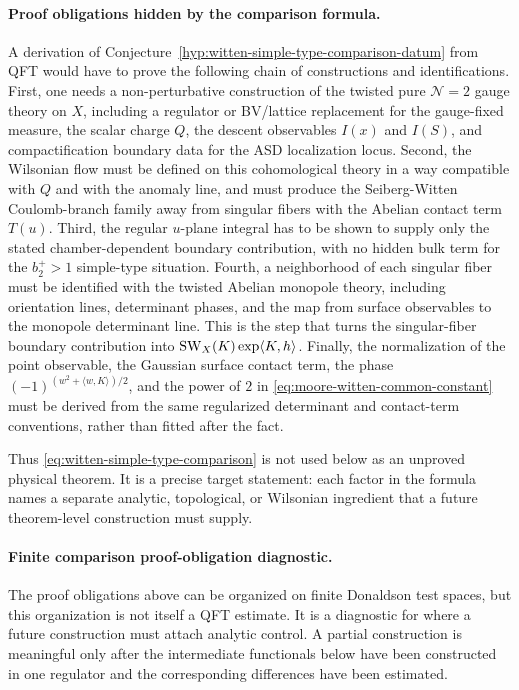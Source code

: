 \paragraph{Proof obligations hidden by the comparison formula.}
A derivation of
Conjecture~\ref{hyp:witten-simple-type-comparison-datum} from
QFT would have to prove the following chain of constructions and
identifications.  First, one needs a non-perturbative construction of the
twisted pure \(\mathcal N=2\) gauge theory on \(X\), including a regulator or
BV/lattice replacement for the gauge-fixed measure, the scalar charge \(Q\),
the descent observables \(I(x)\) and \(I(S)\), and compactification boundary
data for the ASD localization locus.  Second, the Wilsonian flow must be
defined on this cohomological theory in a way compatible with \(Q\) and with
the anomaly line, and must produce the Seiberg-Witten Coulomb-branch family
away from singular fibers with the Abelian contact term \(T(u)\).  Third, the
regular \(u\)-plane integral has to be shown to supply only the stated
chamber-dependent boundary contribution, with no hidden bulk term for the
\(b_2^+>1\) simple-type situation.  Fourth, a neighborhood of each singular
fiber must be identified with the twisted Abelian monopole theory, including
orientation lines, determinant phases, and the map from surface observables to
the monopole determinant line.  This is the step that turns the singular-fiber
boundary contribution into \({\rm SW}_X(K)\exp\langle K,h\rangle\).  Finally,
the normalization of the point observable, the Gaussian surface contact term,
the phase
\((-1)^{(w^2+\langle w,K\rangle)/2}\), and the power of \(2\) in
\eqref{eq:moore-witten-common-constant} must be derived from the same
regularized determinant and contact-term conventions, rather than fitted after
the fact.

Thus \eqref{eq:witten-simple-type-comparison} is not used below as an
unproved physical theorem.  It is a precise target statement: each factor in the
formula names a separate analytic, topological, or Wilsonian ingredient that a
future theorem-level construction must supply.

\paragraph{Finite comparison proof-obligation diagnostic.}
The proof obligations above can be organized on finite Donaldson test spaces,
but this organization is not itself a QFT estimate.  It is a diagnostic for
where a future construction must attach analytic control.  A partial
construction is meaningful only after the intermediate functionals below have
been constructed in one regulator and the corresponding differences have been
estimated.

